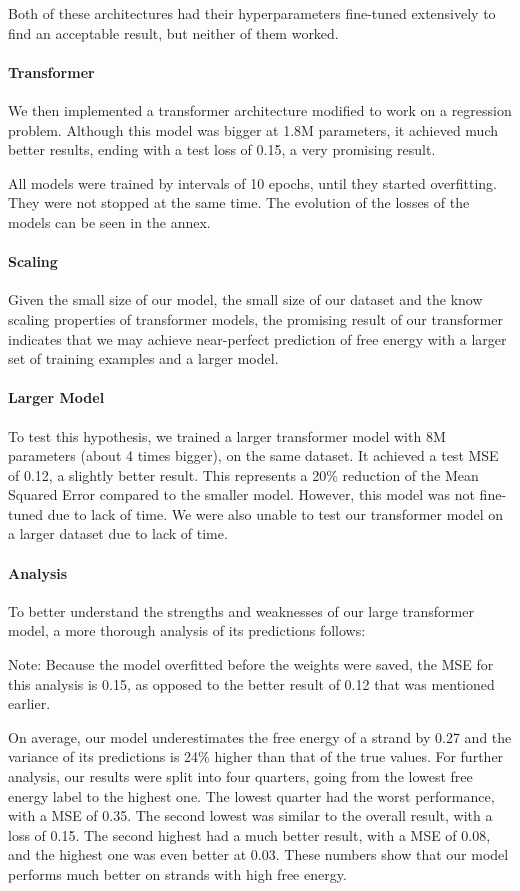 \documentclass{article}
\begin{document}
Both of these architectures had their hyperparameters fine-tuned extensively to find an acceptable result, but neither of them worked.

\paragraph{Transformer} We then implemented a transformer architecture modified to work on a regression problem. Although this model was bigger at 1.8M parameters, it achieved much better results, ending with a test loss of 0.15, a very promising result.

All models were trained by intervals of 10 epochs, until they started overfitting. They were not stopped at the same time. The evolution of the losses of the models can be seen in the annex.


\paragraph{Scaling} Given the small size of our model, the small size of our dataset and the know scaling properties of transformer models, the promising result of our transformer indicates that we may achieve near-perfect prediction of free energy with a larger set of training examples and a larger model.

\paragraph{Larger Model} To test this hypothesis, we trained a larger transformer model with 8M parameters (about 4 times bigger), on the same dataset. It achieved a test MSE of 0.12, a slightly better result. This represents a 20\% reduction of the Mean Squared Error compared to the smaller model. However, this model was not fine-tuned due to lack of time. We were also unable to test our transformer model on a larger dataset due to lack of time.


\paragraph{Analysis} To better understand the strengths and weaknesses of our large transformer model, a more thorough analysis of its predictions follows:

Note: Because the model overfitted before the weights were saved, the MSE for this analysis is 0.15, as opposed to the better result of 0.12 that was mentioned earlier.

On average, our model underestimates the free energy of a strand by 0.27 and the variance of its predictions is 24\% higher than that of the true values. For further analysis, our results were split into four quarters, going from the lowest free energy label to the highest one. The lowest quarter had the worst performance, with a MSE of 0.35. The second lowest was similar to the overall result, with a loss of 0.15. The second highest had a much better result, with a MSE of 0.08, and the highest one was even better at 0.03. These numbers show that our model performs much better on strands with high free energy.
\end{document}
